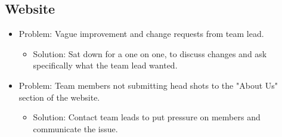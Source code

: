 \documentclass[onecolumn, draftclsnofoot,10pt, compsoc]{IEEEtran}
\begin{document}
\subsection{Website}
\begin{itemize}
\item Problem: Vague improvement and change requests from team lead. 
\begin{itemize}
\item Solution: Sat down for a one on one, to discuss changes and ask specifically what the team lead wanted.
\end{itemize}
\item Problem: Team members not submitting head shots to the "About Us" section of the website.
\begin{itemize}
\item Solution: Contact team leads to put pressure on members and communicate the issue.
\end{itemize}
\end{itemize}
\end{document}
